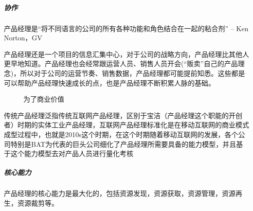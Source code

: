 \documentclass[letterpaper,10pt,english]{sphinxmanual}
\begin{document}
\subparagraph{协作}
\label{\detokenize{chapter_introduction/PM:id4}}
产品经理是“将不同语言的公司的所有各种功能和角色结合在一起的粘合剂” – Ken
Norton，GV %
\begin{footnote}[163]\sphinxAtStartFootnote
{}
%
\end{footnote}

产品经理还是一个项目的信息汇集中心，对于公司的战略方向，产品经理比其他人更早地知道。产品经理也会经常跟运营人员、销售人员开会(“贩卖”自己的产品理念)，所以对于公司的运营节奏、销售数据，产品经理都可能提前知悉。这些都是可以帮助产品经理快速成长的点，也是产品经理不断积累人脉的基础。
%
\begin{footnote}[164]\sphinxAtStartFootnote
{}
%
\end{footnote}

\begin{figure}[H]
\centering
\capstart

\noindent{}
\caption{为了商业价值}\label{\detokenize{chapter_introduction/PM:id67}}\end{figure}

传统产品经理泛指传统互联网产品经理，区别于宝洁（产品经理这个职能的开创者）时期的实体工业产品经理，互联网产品经理标准化是在移动互联网的商业模式成型过程中，也就是2010s这个时期，在这个时期随着移动互联网的发展，各个公司特别是BAT为代表的巨头公司细化了产品经理所需要具备的能力模型，并且基于这个能力模型去对产品人员进行量化考核
%
\begin{footnote}[165]\sphinxAtStartFootnote
{}
%
\end{footnote}


\subparagraph{核心能力}
\label{\detokenize{chapter_introduction/PM:id5}}
产品经理的核心能力是最大化的，包括资源发现，资源获取，资源管理，资源再生，资源裁剪等。
%
\begin{footnote}[166]\sphinxAtStartFootnote
{}
%
\end{footnote}
\end{document}
